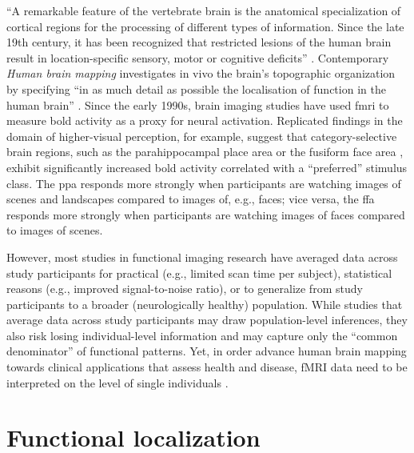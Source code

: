 
``A remarkable feature of the vertebrate brain is the anatomical specialization
of cortical regions for the processing of different types of information. Since
the late 19th century, it has been recognized that restricted lesions of the
human brain result in location-specific sensory, motor or cognitive deficits''
\citep[][p. 268]{cohen1994localization}.
Contemporary \textit{Human brain mapping} \citep[e.g.,][]{raichle2009brief}
investigates in vivo the brain's topographic organization
\citep[e.g.,][]{eickhoff2018topographic} by specifying ``in as much detail as
possible the localisation of function in the human brain'' \citep[][p.
10]{savoy2001history}.
Since the early 1990s, brain imaging studies have used \ac{fmri} to
measure \ac{bold} activity as a proxy for neural activation.
Replicated findings in the domain of higher-visual perception, for example,
suggest that category-selective brain regions, such as the parahippocampal
place area \citep{epstein1998ppa, epstein1999parahippocampal} or the fusiform
face area \citep{kanwisher1997ffa, kanwisher2006fusiform}, exhibit significantly
increased \ac{bold} activity correlated with a ``preferred'' stimulus class.
%
The \ac{ppa} responds more strongly when participants are watching images of
scenes and landscapes compared to images of, e.g., faces;
%
vice versa, the \ac{ffa} responds more strongly when participants are watching
images of faces compared to images of scenes.

%
However, most studies in functional imaging research have averaged data across
study participants for
%
practical (e.g., limited scan time per subject),
%
statistical reasons (e.g., improved signal-to-noise ratio),  %
%
or to generalize from study participants to a broader (neurologically healthy)
population.
%
While studies that average data across study participants may draw
population-level inferences, they also risk losing individual-level information
and may capture only the ``common denominator'' \citep[][p.  2]{pinel2007fast}
of functional patterns.
%
Yet, in order advance human brain mapping towards clinical applications that
assess health and disease, fMRI data need to be interpreted on the level of
single individuals \citep{dubois2016building, wegrzyn2018thought}.



\section{Functional localization}

